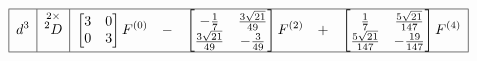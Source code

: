 \begin{table}
\label{table:eigm}
\begin{equation*}
\begin{array}{|>{\displaystyle}c|>{\displaystyle}c|>{\displaystyle}r >{\displaystyle}c >{\displaystyle}r >{\displaystyle}c >{\displaystyle}r|}
\hline
d^3 & \stackrel{2\times}{^2D} & \begin{bmatrix}3 & 0 \\ 0 & 3\end{bmatrix} F^{(0)} & - & \begin{bmatrix}-\frac{1}{7} & \frac{3\sqrt{21}}{49} \\ \frac{3\sqrt{21}}{49} & -\frac{3}{49}\end{bmatrix} F^{(2)} & + & \begin{bmatrix}\frac{1}{7} & \frac{5\sqrt{21}}{147} \\ \frac{5\sqrt{21}}{147} & -\frac{19}{147}\end{bmatrix} F^{(4)} \\
\hline
\end{array}
\end{equation*}


\end{table}
